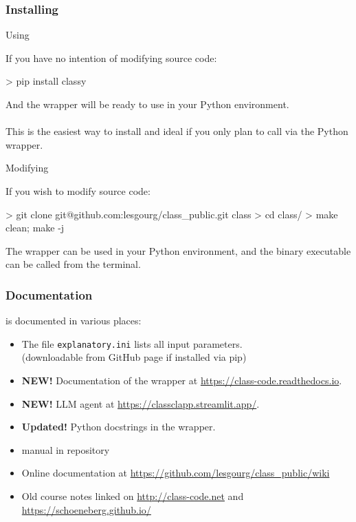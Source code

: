 \begin{frame}[fragile]
	\frametitle{Installing \CLASS{}}

	\begin{minipage}[t][0.8\textheight][t]{.45\textwidth}
      \begin{block}{Using \CLASS{}}
		\begin{minipage}[t][0.42\textheight][t]{\textwidth}
        If you have no intention of modifying source code:
		\begin{class}
> pip install classy
		\end{class}
		And the \CLASS{} wrapper will be ready to use in your Python environment.\\
		\\
		This is the easiest way to install and ideal if you only plan to call \CLASS{} via the Python wrapper.
		\end{minipage}
      \end{block}
	  \end{minipage}
	  \hfill
	\begin{minipage}[t][0.8\textheight][t]{.45\textwidth}
      \begin{block}{Modifying \CLASS{}}
		\begin{minipage}[t][0.42\textheight][t]{\textwidth}
		If you wish to modify source code:
        \begin{class}
> git clone git@github.com:lesgourg/class_public.git class
> cd class/
> make clean; make -j
		\end{class}
	  The wrapper can be used in your Python environment, and the binary executable can be called from the terminal.
	  \end{minipage}
      \end{block}
	  \end{minipage}

\end{frame}

\begin{frame}[fragile]
	\frametitle{Documentation}
	\CLASS{} is documented in various places:
	\begin{itemize}
		\item The file {\Red \texttt{explanatory.ini}} lists all input parameters.\\
		(downloadable from GitHub page if \classy{} installed via pip)\pause
		\item {\Red \textbf{NEW!}} Documentation of the {\Red \classy{}} wrapper at \url{https://class-code.readthedocs.io}.\pause
		\item {\Red \textbf{NEW!}} \CLASS{} LLM agent at \url{https://classclapp.streamlit.app/}.\pause
		\item {\Red \textbf{Updated!}} Python docstrings in the {\Red \classy{}} wrapper.
		\item \CLASS{} manual in repository \pause
		\item Online documentation at \url{https://github.com/lesgourg/class_public/wiki} \pause
		\item Old course notes linked on \url{http://class-code.net} and \url{https://schoeneberg.github.io/}
	\end{itemize}
	

\end{frame}

